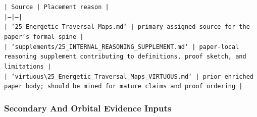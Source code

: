 \documentclass[11pt]{article}
\begin{document}
\noindent\texttt{| Source | Placement reason |}\\
\noindent\texttt{|---|---|}\\
\noindent\texttt{| `25\_Energetic\_Traversal\_Maps.md` | primary assigned source for the paper's formal spine |}\\
\noindent\texttt{| `supplements/25\_INTERNAL\_REASONING\_SUPPLEMENT.md` | paper-local reasoning supplement contributing to definitions, proof sketch, and limitations |}\\
\noindent\texttt{| `virtuous\textbackslash{}25\_Energetic\_Traversal\_Maps\_VIRTUOUS.md` | prior enriched paper body; should be mined for mature claims and proof ordering |}\\

\subsubsection*{Secondary And Orbital Evidence Inputs}
\end{document}

